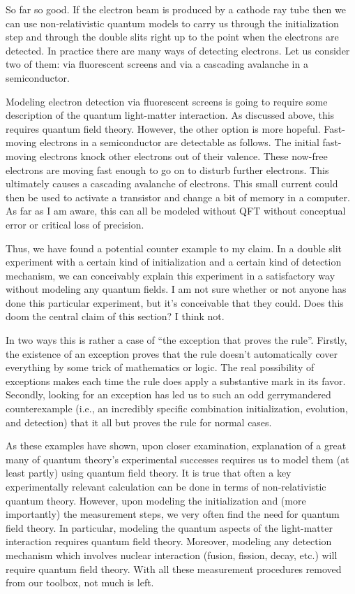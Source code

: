 \documentclass[prd,twocolumn,superscriptaddress,floatfix,amsmath,amssymb,amsfonts,nofootinbib]{revtex4-2}
\begin{document}
So far so good. If the electron beam is produced by a cathode ray tube then we can use non-relativistic quantum models to carry us through the initialization step and through the double slits right up to the point when the electrons are detected. In practice there are many ways of detecting electrons. Let us consider two of them: via fluorescent screens and via a cascading avalanche in a semiconductor. 

Modeling electron detection via fluorescent screens is going to require some description of the quantum light-matter interaction. As discussed above, this requires quantum field theory. However, the other option is more hopeful. Fast-moving electrons in a semiconductor are detectable as follows. The initial fast-moving electrons knock other electrons out of their valence. These now-free electrons are moving fast enough to go on to disturb further electrons. This ultimately causes a cascading avalanche of electrons. This small current could then be used to activate a transistor and change a bit of memory in a computer. As far as I am aware, this can all be modeled without QFT without conceptual error or critical loss of precision.

Thus, we have found a potential counter example to my claim. In a double slit experiment with a certain kind of initialization and a certain kind of detection mechanism, we can conceivably explain this experiment in a satisfactory way without modeling any quantum fields. I am not sure whether or not anyone has done this particular experiment, but it's conceivable that they could. Does this doom the central claim of this section? I think not. 

In two ways this is rather a case of ``the exception that proves the rule''. Firstly, the existence of an exception proves that the rule doesn't automatically cover everything by some trick of mathematics or logic. The real possibility of exceptions makes each time the rule does apply a substantive mark in its favor. Secondly, looking for an exception has led us to such an odd gerrymandered counterexample (i.e., an incredibly specific combination initialization, evolution, and detection) that it all but proves the rule for normal cases.

\vspace{0.5cm}
As these examples have shown, upon closer examination, explanation of a great many of quantum theory's experimental successes requires us to model them (at least partly) using quantum field theory. It is true that often a key experimentally relevant calculation can be done in terms of non-relativistic quantum theory. However, upon modeling the initialization and (more importantly) the measurement steps, we very often find the need for quantum field theory. In particular, modeling the quantum aspects of the light-matter interaction requires quantum field theory. Moreover, modeling any detection mechanism which involves nuclear interaction (fusion, fission, decay, etc.) will require quantum field theory. With all these measurement procedures removed from our toolbox, not much is left. 
\end{document}
